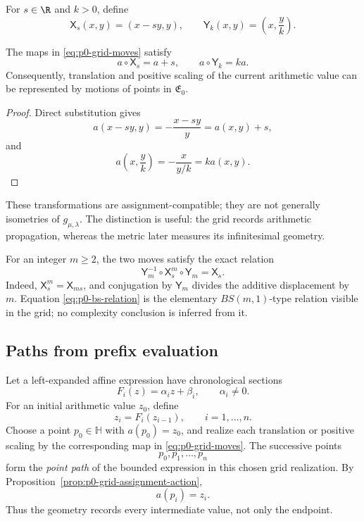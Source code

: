 For $s\in\R$ and $k>0$, define
\begin{equation}\label{eq:p0-grid-moves}
  \mathsf X_s(x,y)=(x-sy,y),
  \qquad
  \mathsf Y_k(x,y)=\left(x,\frac yk\right).
\end{equation}

\begin{proposition}
\label{prop:p0-grid-assignment-action}
The maps in \eqref{eq:p0-grid-moves} satisfy
\[
  a\circ\mathsf X_s=a+s,
  \qquad
  a\circ\mathsf Y_k=ka.
\]
Consequently, translation and positive scaling of the current arithmetic value
can be represented by motions of points in $\mathfrak E_0$.
\end{proposition}

\begin{proof}
Direct substitution gives
\[
  a(x-sy,y)=-\frac{x-sy}{y}=a(x,y)+s,
\]
and
\[
  a\left(x,\frac yk\right)
  =-\frac{x}{y/k}=k a(x,y).
\]
\end{proof}

These transformations are assignment-compatible; they are not generally
isometries of $g_{\mu,\lambda}$.  The distinction is useful: the grid records
arithmetic propagation, whereas the metric later measures its infinitesimal
geometry.

For an integer $m\ge2$, the two moves satisfy the exact relation
\begin{equation}\label{eq:p0-bs-relation}
  \mathsf Y_m^{-1}\circ\mathsf X_s^m\circ\mathsf Y_m
  =\mathsf X_s.
\end{equation}
Indeed, $\mathsf X_s^m=\mathsf X_{ms}$, and conjugation by
$\mathsf Y_m$ divides the additive displacement by $m$.  Equation
\eqref{eq:p0-bs-relation} is the elementary $BS(m,1)$-type relation visible in
the grid; no complexity conclusion is inferred from it.

\subsection{Paths from prefix evaluation}

Let a left-expanded affine expression have chronological sections
\[
  F_i(z)=\alpha_i z+\beta_i,
  \qquad \alpha_i\ne0.
\]
For an initial arithmetic value $z_0$, define
\[
  z_i=F_i(z_{i-1}),
  \qquad i=1,\ldots,n.
\]
Choose a point $p_0\in\mathbb H$ with $a(p_0)=z_0$, and realize each
translation or positive scaling by the corresponding map in
\eqref{eq:p0-grid-moves}.  The successive points
\[
  p_0,p_1,\ldots,p_n
\]
form the \emph{point path} of the bounded expression in this chosen grid
realization.  By Proposition~\ref{prop:p0-grid-assignment-action},
\[
  a(p_i)=z_i.
\]
Thus the geometry records every intermediate value, not only the endpoint.

